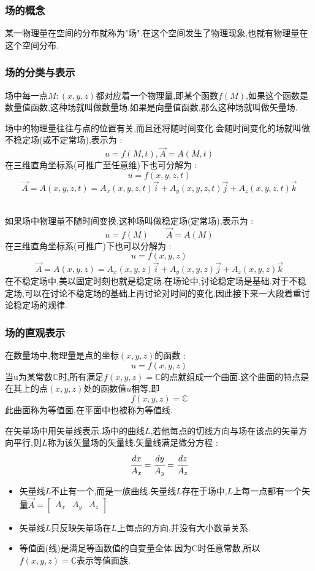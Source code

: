 \documentclass[UTF8,12pt]{ctexbook}
\newcommand{\defFunction}[1]{f(#1)}
\newcommand{\mathConstant}{\mathbb{C}}
\newcommand{\spaceline}{\\\indent}
\begin{document}
{{{{    \subsubsection{场的概念}{
      某一物理量在空间的分布就称为"场".在这个空间发生了物理现象,也就有物理量在这个空间分布.
    }%

    \subsubsection{场的分类与表示}{
      场中每一点$M:(x,y,z)$都对应着一个物理量,即某个函数$\defFunction{M}$,如果这个函数是数量值函数,这种场就叫做数量场.如果是向量值函数,那么这种场就叫做矢量场.

      场中的物理量往往与点的位置有关,而且还将随时间变化.会随时间变化的场就叫做不稳定场(或不定常场),表示为 :
      $$
        u= \defFunction{M,t},\vec{A} = A(M,t)
      $$
      在三维直角坐标系(可推广至任意维)下也可分解为 :
      $$
        u = \defFunction{x,y,z,t}
      $$
      $$
        \vec{A} = A(x,y,z,t) = A_x(x,y,z,t)\vec{i} + A_y(x,y,z,t)\vec{j} + A_z(x,y,z,t)\vec{k}
      $$\spaceline

      如果场中物理量不随时间变换,这种场叫做稳定场(定常场),表示为 :
      $$
        u= \defFunction{M}\qquad \vec{A} = A(M)
      $$
      在三维直角坐标系(可推广)下也可以分解为 :
      $$
        u= \defFunction{x,y,z}
      $$
      $$
        \vec{A} = A(x,y,z) = A_x(x,y,z)\vec{i} + A_y(x,y,z)\vec{j} + A_z(x,y,z)\vec{k}
      $$
      在不稳定场中,美以固定时刻也就是稳定场.在场论中,讨论稳定场是基础.对于不稳定场,可以在讨论不稳定场的基础上再讨论对时间的变化.因此接下来一大段着重讨论稳定场的规律.
    }%

    \subsubsection{场的直观表示}{
      在数量场中,物理量是点的坐标$(x,y,z)$的函数 :
      $$
        u = \defFunction{x,y,z}
      $$
      当u为某常数$\mathConstant$时,所有满足$\defFunction{x,y,z} = \mathConstant$的点就组成一个曲面.这个曲面的特点是在其上的点$(x,y,z)$处的函数值$u$相等,即
      $$
        \defFunction{x,y,z} = \mathConstant
      $$
      此曲面称为等值面,在平面中也被称为等值线.

      在矢量场中用矢量线表示.场中的曲线$L$,若他每点的切线方向与场在该点的矢量方向平行,则$L$称为该矢量场的矢量线.矢量线满足微分方程 :
      $$
        \cfrac{dx}{A_x} = \cfrac{dy}{A_y} = \cfrac{dz}{A_z}
      $$

      \begin{itemize}
        \item 矢量线$L$不止有一个,而是一族曲线.矢量线$L$存在于场中,$L$上每一点都有一个矢量$\vec{A} = \begin{bmatrix}
                  A_x & A_y & A_z
                \end{bmatrix}$
        \item 矢量线$L$只反映矢量场在$L$上每点的方向,并没有大小数量关系.
        \item 等值面(线)是满足等函数值的自变量全体.因为C时任意常数,所以$\defFunction{x,y,z} = \mathConstant$表示等值面族.
      \end{itemize}
    }%

}}}}
\end{document}
